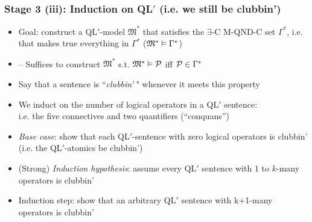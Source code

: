\begin{frame}
\frametitle{Stage 3 (iii): Induction on QL$'$ (i.e. we still be clubbin')}


\begin{itemize}[<+->]

\item Goal: construct a QL$'$-model $\mathfrak{M}^{\ast}$ that satisfies the $\exists$-C M-QND-C set $\Gamma^{\ast}$, i.e. that makes true everything in $\Gamma^{\ast}$ ($\mathfrak{M}^{\ast} \vDash \Gamma^{\ast}$)

\item[] -- Suffices to construct $\mathfrak{M}^{\ast}$ s.t.  $\mathfrak{M}^{\ast} \vDash \mathcal{P}$ iff $\mathcal{P} \in \Gamma^{\ast}$ 

\item[] Say that a sentence is ``\emph{clubbin'} " whenever it meets this property

\item We induct on the number of logical operators in a QL$'$ sentence: \\ i.e. the five connectives and two quantifiers (``conquans'')



\item \emph{Base case}: show that each QL$'$-sentence with \alert{zero} logical operators is clubbin' (i.e. the QL$'$-atomics be clubbin')


\item (Strong) \emph{Induction hypothesis}: assume every QL$'$ sentence with $1$ to $k$-many operators is clubbin' 

\item Induction step: show that an arbitrary QL$'$ sentence with k+1-many operators is clubbin' 


\end{itemize}
\end{frame}

